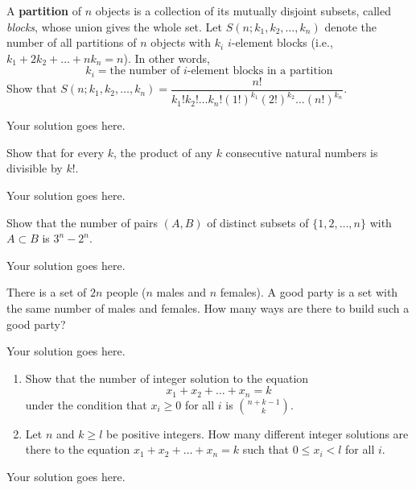 \documentclass[12pt]{article}
\begin{document}
    \noindent
    
    \onehalfspace
    \thispagestyle{plain}

    \begin{question}
        A \textbf{partition} of $n$ objects is a collection of its mutually disjoint subsets, called \textit{blocks}, whose union gives the whole set. Let $S(n; k_1, k_2, \dots, k_n)$ denote the number of all partitions of $n$ objects with $k_i$ $i$-element blocks (i.e., $k_1 + 2k_2 + \dots + nk_n = n$). In other words, 
        \[k_i = \text{the number of $i$-element blocks in a partition}\]
    Show that $S(n; k_1, k_2, \dots, k_n) = \dfrac{n!}{k_1!k_2!\dots k_n! (1!)^{k_1}(2!)^{k_2}\dots (n!)^{k_n}}$.
    \end{question}

    \begin{solution}
        Your solution goes here.
    \end{solution}

    \begin{question}
        Show that for every $k$, the product of any $k$ consecutive natural numbers is divisible by $k!$.
    \end{question}
    \begin{solution}
        Your solution goes here.
    \end{solution}

    \begin{question}
        Show that the number of pairs $(A, B)$ of distinct subsets of $\{1,2, \dots, n\}$ with $A \subset B$ is $3^n - 2^n$.
    \end{question}
    
    \begin{solution}
        Your solution goes here.
    \end{solution}

    \begin{question}
        There is a set of $2n$ people ($n$ males and $n$ females). A good party is a set with the same number of males and females. How many ways are there to build such a good party?
    \end{question}
    
    \begin{solution}
        Your solution goes here.
    \end{solution}

    \begin{question}
        \begin{enumerate}
            \item Show that the number of integer solution to the equation
                \[x_1 + x_2 + \dots + x_n = k\]
            under the condition that $x_i \geq 0$ for all $i$ is $\binom{n+k-1}{k}$.
            
            \item Let $n$ and $k \geq l$ be positive integers. How many different integer solutions are there to the equation $x_1 + x_2 + \dots + x_n = k$ such that $0 \leq x_i < l$ for all $i$.
        \end{enumerate}
    \end{question}

    \begin{solution}
        Your solution goes here.
    \end{solution}

    
    
\end{document}
